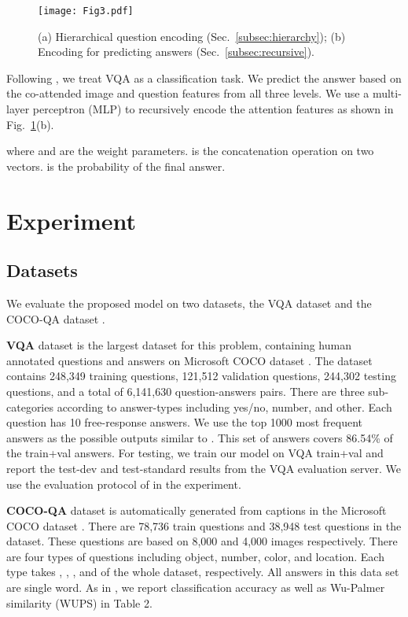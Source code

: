 \documentclass{article}
\begin{document}
\begin{figure}[t]
 \centering 
 \texttt{[image: Fig3.pdf]}
 \caption{(a) Hierarchical question encoding (Sec.~\ref{subsec:hierarchy}); (b) Encoding for predicting answers (Sec.~\ref{subsec:recursive}).}
 \label{fig:added}
\end{figure}

Following \cite{antol2015vqa}, we treat VQA as a classification task. We predict the answer based on the co-attended image and question features from all three levels. We use a multi-layer perceptron (MLP) to recursively encode the attention features as shown in Fig.~\ref{fig:added}(b).

where  and  are the weight parameters.  is the concatenation operation on two vectors.  is the probability of the final answer.  
%
 \section{Experiment}
\vspace*{-2mm}
\label{sec:exp}
\subsection{Datasets}
We evaluate the proposed model on two datasets, the VQA dataset \cite{antol2015vqa} and the COCO-QA dataset \cite{ren2015exploring}.

\textbf{VQA} dataset \cite{antol2015vqa} is the largest dataset for this problem, containing human annotated questions and answers on Microsoft COCO dataset \cite{lin2014microsoft}. The dataset contains 248,349 training questions, 121,512 validation questions, 244,302 testing questions, and a total of 6,141,630 question-answers pairs. There are three sub-categories according to answer-types including yes/no, number, and other. Each question has 10 free-response answers. We use the top 1000 most frequent answers as the possible outputs similar to \cite{antol2015vqa}. This set of answers covers 86.54\% of the train+val answers. For testing, we train our model on VQA train+val and report the test-dev and test-standard results from the VQA evaluation server. We use the evaluation protocol of \cite{antol2015vqa} in the experiment.

\textbf{COCO-QA} dataset \cite{ren2015exploring} is automatically generated from captions in the Microsoft COCO dataset \cite{lin2014microsoft}. There are 78,736 train questions and 38,948 test questions in the dataset. These questions are based on 8,000 and 4,000 images respectively.  There are four types of questions including object, number, color, and location. Each type takes , , , and  of the whole dataset, respectively. All answers in this data set are single word. As in \cite{ren2015exploring}, we report classification accuracy as well as Wu-Palmer similarity (WUPS) in Table 2.
\end{document}
